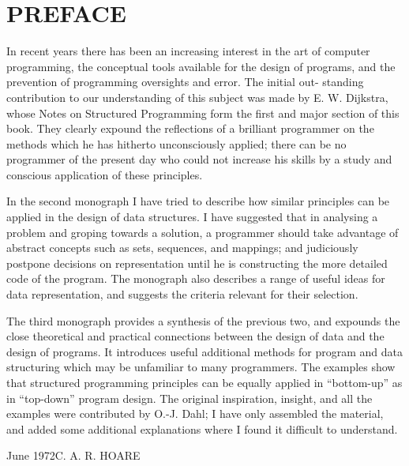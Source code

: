 \chapter*{PREFACE}

\noindent
In recent years there has been an increasing interest in the art of computer programming, the conceptual tools available for the design of programs, and the prevention of programming oversights and error. The initial out- standing contribution to our understanding of this subject was made by E. W. Dijkstra, whose Notes on Structured Programming form the first and major section of this book. They clearly expound the reflections of a brilliant programmer on the methods which he has hitherto unconsciously applied; there can be no programmer of the present day who could not increase his skills by a study and conscious application of these principles.

In the second monograph I have tried to describe how similar principles can be applied in the design of data structures. I have suggested that in analysing a problem and groping towards a solution, a programmer should take advantage of abstract concepts such as sets, sequences, and mappings; and judiciously postpone decisions on representation until he is constructing the more detailed code of the program. The monograph also describes a range of useful ideas for data representation, and suggests the criteria relevant for their selection.

The third monograph provides a synthesis of the previous two, and expounds the close theoretical and practical connections between the design of data and the design of programs. It introduces useful additional methods for program and data structuring which may be unfamiliar to many programmers. The examples show that structured programming principles can be equally applied in ``bottom-up'' as in ``top-down'' program design. The original inspiration, insight, and all the examples were contributed by O.-J. Dahl; I have only assembled the material, and added some additional explanations where I found it difficult to understand.
\bigskip
 
\noindent
June 1972\hfill C. A. R. HOARE
